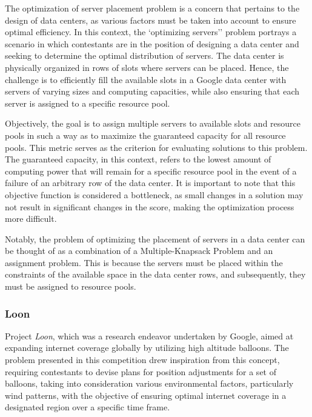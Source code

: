 The optimization of server placement problem is a concern that pertains to the
design of data centers, as various factors must be taken into account to ensure
optimal efficiency. In this context, the `optimizing servers'' problem portrays
a scenario in which contestants are in the position of designing a data center
and seeking to determine the optimal distribution of servers. The data center
is physically organized in rows of slots where servers can be placed. Hence,
the challenge is to efficiently fill the available slots in a Google data center
with servers of varying sizes and computing capacities, while also ensuring that
each server is assigned to a specific resource pool.

Objectively, the goal is to assign multiple servers to available slots and
resource pools in such a way as to maximize the guaranteed capacity for all
resource pools. This metric serves as the criterion for evaluating solutions to
this problem. The guaranteed capacity, in this context, refers to the lowest
amount of computing power that will remain for a specific resource pool in the
event of a failure of an arbitrary row of the data center. It is important to
note that this objective function is considered a bottleneck, as small changes
in a solution may not result in significant changes in the score, making the
optimization process more difficult.

Notably, the problem of optimizing the placement of servers in a data center can
be thought of as a combination of a Multiple-Knapsack Problem and an assignment
problem. This is because the servers must be placed within the constraints of
the available space in the data center rows, and subsequently, they must be
assigned to resource pools.

\subsubsection*{Loon}
\label{subsubsec:hashcode-2015-final}

Project \textit{Loon}, which was a research endeavor undertaken by Google, aimed at
expanding internet coverage globally by utilizing high altitude balloons. The
problem presented in this competition drew inspiration from this concept,
requiring contestants to devise plans for position adjustments for a set of
balloons, taking into consideration various environmental factors, particularly
wind patterns, with the objective of ensuring optimal internet coverage in a
designated region over a specific time frame.

